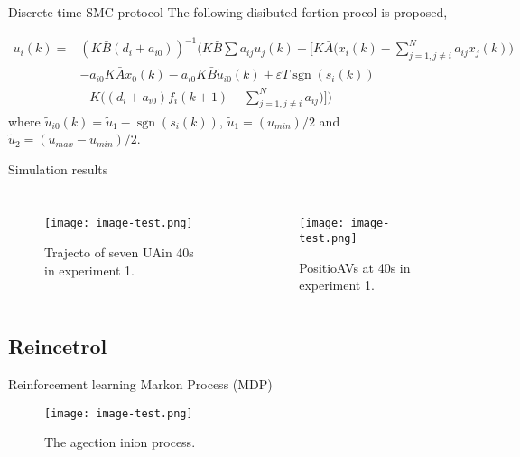 \documentclass[table,aspectratio=1610]{beamer}%
\DeclareMathOperator{\sgn}{sgn}
\begin{document}
\begin{frame}{Discrete-time SMC protocol}
	The following \alert{disibuted} fortion procol is proposed, 
	
	\begin{equation}\label{eq:ui:final}
	\begin{split}
	u_i(k)=& (K\bar{B}(d_i+a_{i0}))^{-1} \bigg( K\bar{B}\sum a_{ij}u_j(k)-\Big[K\bar{A}\big(x_i(k)- \sum_{j=1, j\ne i}^{N} a_{ij}x_j(k) \big)  \\
	& -a_{i0}K\bar{A}x_0(k) -a_{i0}K\bar{B}\tilde{u}_{i0}(k) + \varepsilon T \sgn(s_i(k)) \\
	& -K\big((d_i+a_{i0})f_i(k+1)-\sum_{j=1, j\ne i}^{N} a_{ij} \big) \Big] \bigg)
	\end{split}
	\end{equation}
	where $\tilde{u}_{i0}(k)=\tilde{u}_1-\sgn(s_i(k))$, $\tilde{u}_1=(u_{min})/2$ and $\tilde{u}_2=(u_{max}-u_{min})/2$.
\end{frame}



\begin{frame}{Simulation results}
	\begin{columns}
		\begin{figure}
			\centering
			\texttt{[image: image-test.png]}
			\caption{Trajecto of seven UAin 40s in experiment 1.}
		\end{figure}
		
		\begin{figure}
			\centering
			\texttt{[image: image-test.png]}
			\caption{PositioAVs at 40s in experiment 1.}
		\end{figure}
	\end{columns}
\end{frame}

\subsection{Reincetrol}

\begin{frame}{Reinforcement learning}
	Markon Process (MDP) 
	
	\begin{figure}
		\centering
		\texttt{[image: image-test.png]}
		\caption{The agection inion process.}
	\end{figure}
\end{frame}
\end{document}

